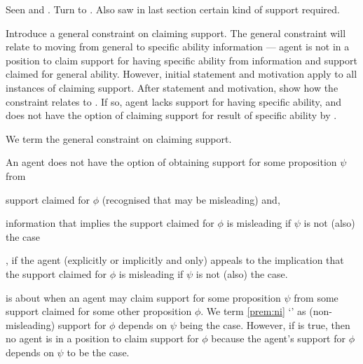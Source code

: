 \begin{note}
  Seen \uRa{} and \WR{}.
  Turn to \AR{}.
  Also saw in last section certain kind of support required.

  Introduce a general constraint on claiming support.
  The general constraint will relate to moving from general to specific ability information --- agent is not in a position to claim support for having specific ability from information and support claimed for general ability.
  However, initial statement and motivation apply to all instances of claiming support.
  After statement and motivation, show how the constraint relates to \AR{}.
  If so, agent lacks support for having specific ability, and does not have the option of claiming support for result of specific ability by \AR{}.
\end{note}

\begin{note}
 We term the general constraint on claiming support.
  \begin{proposition}[\nI{-}  --- \nI{}]\label{prem:ni}
    An agent does not have the option of obtaining support for some proposition \(\psi\) from
    \begin{enumerate*}[label=(\alph*)]
    \item support claimed for \(\phi\) (recognised that may be misleading) and,
    \item information that implies the support claimed for \(\phi\) is misleading if \(\psi\) is not (also) the case
    \end{enumerate*}\nolinebreak
    , if the agent (explicitly or implicitly and only) appeals to the implication that the support claimed for \(\phi\) is misleading if \(\psi\) is not (also) the case.
  \end{proposition}
  \nI{} is about when an agent may claim support for some proposition \(\psi\) from some support claimed for some other proposition \(\phi\).
  We term \autoref{prem:ni} `\nI{-}' as (non-misleading) support for \(\phi\) depends on \(\psi\) being the case.
  However, if \nI{} is true, then no agent is in a position to claim support for \(\phi\) because the agent's support for \(\phi\) depends on \(\psi\) to be the case.
\end{note}


